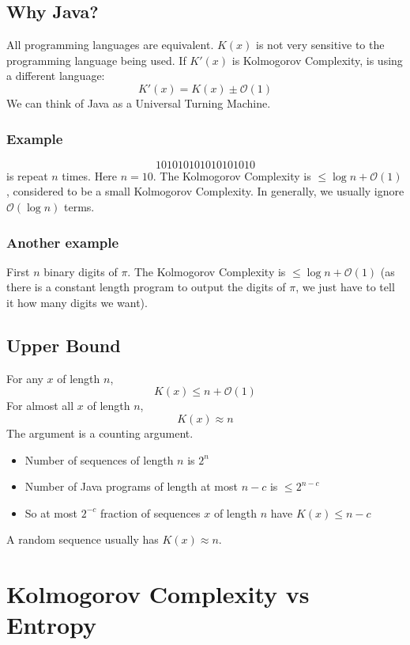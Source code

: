 \documentclass{article}
\begin{document}
\subsection{Why Java?}

All programming languages are equivalent. $K(x)$ is not very sensitive to the programming language being used. If $K'(x)$ is Kolmogorov Complexity, is using a different language:
\[
K'(x) = K(x) \pm \mathcal{O}(1)
\]
We can think of Java as a Universal Turning Machine.

\subsubsection{Example}
\[
101010101010101010
\]
is repeat $n$ times. Here $n=10$. The Kolmogorov Complexity is $\leq\log n + \mathcal{O}(1)$, considered to be a small Kolmogorov Complexity. In generally, we usually ignore $\mathcal{O}(\log n)$  terms.

\subsubsection{Another example}

First $n$ binary digits of $\pi$. The Kolmogorov Complexity is  $\leq\log n + \mathcal{O}(1)$ (as there is a constant length program to output the digits of $\pi$, we just have to tell it how many digits we want).

\subsection{Upper Bound}

For any $x$ of length $n$,
\[
K(x) \leq n + \mathcal{O}(1)
\]
For almost all $x$ of length $n$,
\[
K(x)\approx n
\]
The argument is a counting argument.
\begin{itemize}
    \item Number of sequences of length $n$ is $2^n$
    \item Number of Java programs of length at most $n-c$ is $\leq 2^{n-c}$
    \item So at most $2^{-c}$ fraction of sequences $x$ of length $n$ have $K(x)\leq n-c$
\end{itemize}
A random sequence usually has $K(x)\approx n$.

\section{Kolmogorov Complexity vs Entropy}
\end{document}
